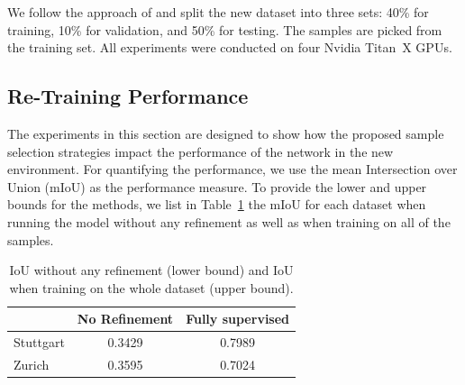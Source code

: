 \documentclass[letterpaper, 10 pt, conference]{ieeeconf}  %
\begin{document}
We follow the approach of \cite{milioto2018real} and split the new dataset into three sets: 40\% for training, 10\% for validation, and 50\% for testing. The samples are picked from the training set. All experiments were conducted on four Nvidia Titan~X GPUs.  


\subsection{Re-Training Performance}

The experiments in this section are designed to show how the proposed sample selection strategies impact the performance of the network in the new environment. For quantifying the performance, we use the mean Intersection over Union (mIoU) as the performance measure. To provide the lower and upper bounds for the methods, we list in Table~\ref{tab:null_and_fully_supervised}  the mIoU for each dataset when running the model without any refinement as well as when training on all of the samples. 

            \begin{table}
          \vspace{1em}
        \centering
        \caption{IoU without any refinement (lower bound) and IoU when training on the whole dataset (upper bound).}
        \begin{tabular}{@{}lcc@{}} 
            \toprule
              &  No Refinement  & Fully supervised \\ 
            \midrule 
    		  Stuttgart  & 0.3429 & 0.7989  \\ \addlinespace
    		  Zurich  & 0.3595 & 0.7024  \\
    	
            \bottomrule
        \end{tabular}
        \label{tab:null_and_fully_supervised}
    \end{table}
\end{document}
